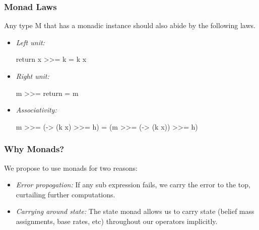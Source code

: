 \documentclass{beamer}
\begin{document}

\begin{frame}[fragile]
\frametitle{Monad Laws}

Any type M that has a monadic instance should also abide by the following
laws.

\begin{itemize}
  \item \emph{Left unit:}
    \begin{code}
      return x >>= k = k x
    \end{code}

  \item \emph{Right unit:}
    \begin{code}
      m >>= return = m
    \end{code}

  \item \emph{Associativity:}
    \begin{code}
      m >>= (\x -> (k x) >>= h)
        = (m >>= (\x -> (k x)) >>= h)
    \end{code}

\end{itemize}

\end{frame}







\begin{frame}
\frametitle{Why Monads?}

We propose to use monads for two reasons:

\begin{itemize}
  \item \emph{Error propogation:} If any sub expression fails, we carry the
    error to the top, curtailing further computations.
  \item \emph{Carrying around state:} The state monad allows us to carry state
    (belief mass assignments, base rates, etc) throughout our operators implicitly.
\end{itemize}

\end{frame}
\end{document}
